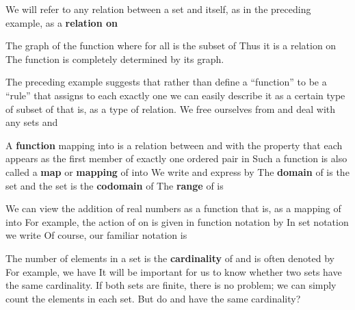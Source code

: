 \documentclass[11pt,oneside]{article}
\begin{document}
\begin{BookBody}
We will refer to any relation between a set  and itself, as in the preceding example, as a\textbf{ relation on} 

 The graph of the function  where  for all  is the subset  of  Thus it is a relation on  The function is completely determined by its graph. \BookEnd{\blacktriangle}

The preceding example suggests that rather than define a “function”  to be a “rule” that assigns to each  exactly one  we can easily describe it as a certain type of subset of  that is, as a type of relation. We free ourselves from  and deal with any sets  and 

 A\textbf{ function} \BookInline{\phi } mapping  into  is a relation between  and  with the property that each  appears as the first member of exactly one ordered pair  in  Such a function is also called a\textbf{ map} or\textbf{ mapping} of  into  We write  and express  by  The\textbf{ domain} of \BookInline{\phi } is the set  and the set  is the\textbf{ codomain} of  The\textbf{ range} of \BookInline{\phi } is \BookEnd{\blacksquare}

 We can view the addition of real numbers as a function  that is, as a mapping of  into  For example, the action of \BookInline{+ } on  is given in function notation by  In set notation we write  Of course, our familiar notation is \BookEnd{\blacktriangle}


\noindent The number of elements in a set  is the\textbf{ cardinality} of  and is often denoted by  For example, we have  It will be important for us to know whether two sets have the same cardinality. If both sets are finite, there is no problem; we can simply count the elements in each set. But do  and  have the same cardinality?

\end{BookBody}
\end{document}
